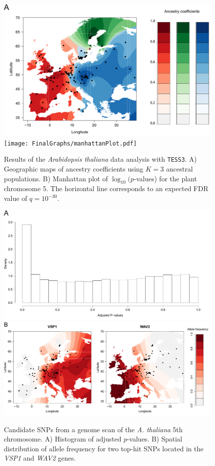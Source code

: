 \begin{figure}[h!]\centering
\includegraphics[width=\linewidth]{FinalGraphs/barsClusters.pdf}
\texttt{[image: FinalGraphs/manhattanPlot.pdf]}
\caption{Results of the {\it Arabidopsis thaliana} data analysis with {\tt TESS3}. A) Geographic maps of ancestry coefficients using $K = 3$ ancestral populations. B) Manhattan plot of $\log_{10}(p$-values) for the plant chromosome 5. The horizontal line corresponds to an expected FDR value of $q = 10^{-30}$.}
\end{figure}    

\clearpage
\newpage 

\begin{figure}[h!]\centering
\includegraphics[width=\linewidth]{FinalGraphs/pValueHist.pdf}
\includegraphics[width=\linewidth]{FinalGraphs/colorBar.pdf}
\caption{Candidate SNPs from a genome scan of the {\it A. thaliana} 5th chromosome. A) Histogram of adjusted $p$-values. B) Spatial distribution of allele frequency for two top-hit SNPs located in the {\it VSP1} and {\it WAV2} genes.}
\end{figure}    


